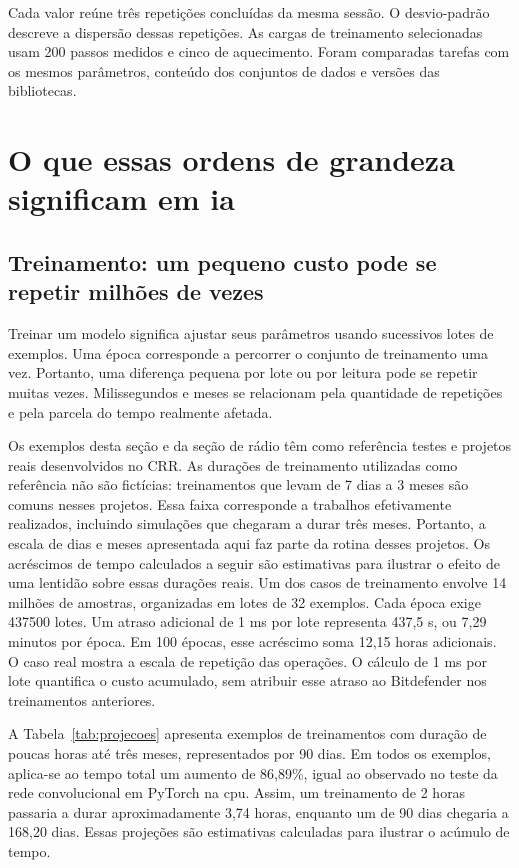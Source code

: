 \documentclass[11pt,a4paper]{article}
\begin{document}
Cada valor reúne três repetições concluídas da mesma sessão. O desvio-padrão descreve a dispersão dessas repetições. As cargas de treinamento selecionadas usam 200 passos medidos e cinco de aquecimento. Foram comparadas tarefas com os mesmos parâmetros, conteúdo dos conjuntos de dados e versões das bibliotecas.

\section{O que essas ordens de grandeza significam em \texorpdfstring{\ac{ia}}{IA}}
\subsection{Treinamento: um pequeno custo pode se repetir milhões de vezes}
Treinar um modelo significa ajustar seus parâmetros usando sucessivos lotes de exemplos. Uma época corresponde a percorrer o conjunto de treinamento uma vez. Portanto, uma diferença pequena por lote ou por leitura pode se repetir muitas vezes. Milissegundos e meses se relacionam pela quantidade de repetições e pela parcela do tempo realmente afetada.

Os exemplos desta seção e da seção de rádio têm como referência testes e projetos reais desenvolvidos no CRR. As durações de treinamento utilizadas como referência não são fictícias: treinamentos que levam de 7 dias a 3 meses são comuns nesses projetos. Essa faixa corresponde a trabalhos efetivamente realizados, incluindo simulações que chegaram a durar três meses. Portanto, a escala de dias e meses apresentada aqui faz parte da rotina desses projetos. Os acréscimos de tempo calculados a seguir são estimativas para ilustrar o efeito de uma lentidão sobre essas durações reais. Um dos casos de treinamento envolve 14 milhões de amostras, organizadas em lotes de 32 exemplos. Cada época exige 437500 lotes. Um atraso adicional de 1 ms por lote representa 437,5 s, ou 7,29 minutos por época. Em 100 épocas, esse acréscimo soma 12,15 horas adicionais. O caso real mostra a escala de repetição das operações. O cálculo de 1 ms por lote quantifica o custo acumulado, sem atribuir esse atraso ao Bitdefender nos treinamentos anteriores.

A Tabela~\ref{tab:projecoes} apresenta exemplos de treinamentos com duração de poucas horas até três meses, representados por 90 dias. Em todos os exemplos, aplica-se ao tempo total um aumento de 86,89\%, igual ao observado no teste da rede convolucional em PyTorch na \ac{cpu}. Assim, um treinamento de 2 horas passaria a durar aproximadamente 3,74 horas, enquanto um de 90 dias chegaria a 168,20 dias. Essas projeções são estimativas calculadas para ilustrar o acúmulo de tempo.
\end{document}
